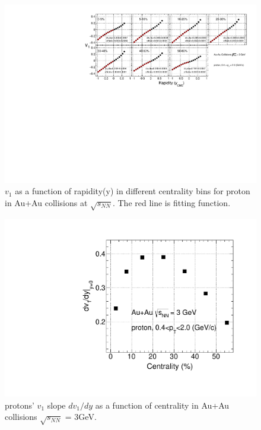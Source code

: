 \begin{figure}[h]
\includegraphics[scale=0.8]{chapter3/fig/v1ypikp/v1proton_cent.pdf}
\caption{\label{proton_v1y_cent} $v_{1}$ as a function of rapidity(y) in different centrality bins for proton in Au+Au collisions at $\sqrt{s_{NN}}$. The red line is fitting function.}
\end{figure}

\begin{figure}[h]
\centering
\includegraphics[scale=0.5]{chapter3/fig/v1ypikp/dv1dy_proton.pdf}
\caption{\label{kaon_dv1dy_cent} protons' $v_{1}$ slope $dv_{1}/dy$ as a function of centrality in Au+Au collisions $\sqrt{s_{NN}}$ = 3GeV.}
\end{figure}

